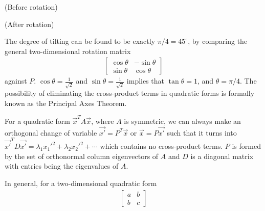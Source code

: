 \begin{exmp}
\begin{center}
(Before rotation) \\
(After rotation)
\end{center}
The degree of tilting can be found to be exactly $\pi/4 = 45^{\circ}$, by comparing the general two-dimensional rotation matrix
\begin{align*}
\begin{bmatrix}
\cos \theta & -\sin \theta \\
\sin \theta & \cos \theta
\end{bmatrix}
\end{align*}
against $P$. $\cos \theta = \frac{1}{\sqrt{2}}$ and $\sin \theta = \frac{1}{\sqrt{2}}$ implies that $\tan \theta = 1$, and $\theta = \pi/4$. The possibility of eliminating the cross-product terms in quadratic forms is formally known as the Principal Axes Theorem.
\end{exmp}
\begin{thm}
For a quadratic form $\vec{x}^TA\vec{x}$, where $A$ is symmetric, we can always make an orthogonal change of variable $\vec{x'} = P^T\vec{x}$ or $\vec{x} = P\vec{x'}$ such that it turns into $\vec{x'}^TD\vec{x'} = \lambda_1 x_1'^2 + \lambda_2 x_2'^2 + \cdots$ which contains no cross-product terms. $P$ is formed by the set of orthonormal column eigenvectors of $A$ and $D$ is a diagonal matrix with entries being the eigenvalues of $A$.
\end{thm}
In general, for a two-dimensional quadratic form
\begin{align*}
\begin{bmatrix}
a & b \\
b & c
\end{bmatrix}
\end{align*}
